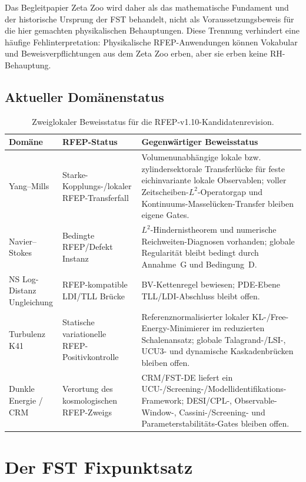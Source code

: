 \documentclass[11pt,a4paper]{article}
\theoremstyle{plain}
\theoremstyle{definition}
\begin{document}
Das Begleitpapier Zeta Zoo \cite{ZetaZooMaster} wird daher als das mathematische Fundament und der historische Ursprung der FST behandelt, nicht als Voraussetzungsbeweis für die hier gemachten physikalischen Behauptungen. Diese Trennung verhindert eine häufige Fehlinterpretation: Physikalische RFEP-Anwendungen können Vokabular und Beweisverpflichtungen aus dem Zeta Zoo erben, aber sie erben keine RH-Behauptung.

\subsection{Aktueller Domänenstatus}

\begin{table}[h]
\centering
\begin{tabular}{p{} p{} p{}}
\toprule
Domäne & RFEP-Status & Gegenwärtiger Beweisstatus \\
\midrule
Yang--Mills & Starke-Kopplungs-/lokaler RFEP-Transferfall &
Volumenunabhängige lokale bzw. zylindersektorale Transferlücke für feste eichinvariante lokale Observablen; voller Zeitscheiben-$L^2$-Operatorgap und Kontinuums-Masselücken-Transfer bleiben eigene Gates. \\
Navier--Stokes & Bedingte RFEP/Defekt Instanz &
$L^2$-Hindernistheorem und numerische Reichweiten-Diagnosen vorhanden; globale Regularität bleibt bedingt durch Annahme~G und Bedingung~D. \\
NS Log-Distanz Ungleichung & RFEP-kompatible LDI/TLL Brücke &
BV-Kettenregel bewiesen; PDE-Ebene TLL/LDI-Abschluss bleibt offen. \\
Turbulenz K41 & Statische variationelle RFEP-Positivkontrolle &
Referenznormalisierter lokaler KL-/Free-Energy-Minimierer im reduzierten Schalenansatz; globale Talagrand-/LSI-, UCU3- und dynamische Kaskadenbrücken bleiben offen. \\
Dunkle Energie / CRM & Verortung des kosmologischen RFEP-Zweigs &
CRM/FST-DE liefert ein UCU-/Screening-/Modellidentifikations-Framework; DESI/CPL-, Observable-Window-, Cassini-/Screening- und Parameterstabilitäts-Gates bleiben offen. \\
\bottomrule
\end{tabular}
\caption{Zweiglokaler Beweisstatus für die RFEP-v1.10-Kandidatenrevision.}
\label{tab:domain-status}
\end{table}

\section{Der FST Fixpunktsatz}
\label{sec:fixed-point}
\end{document}
